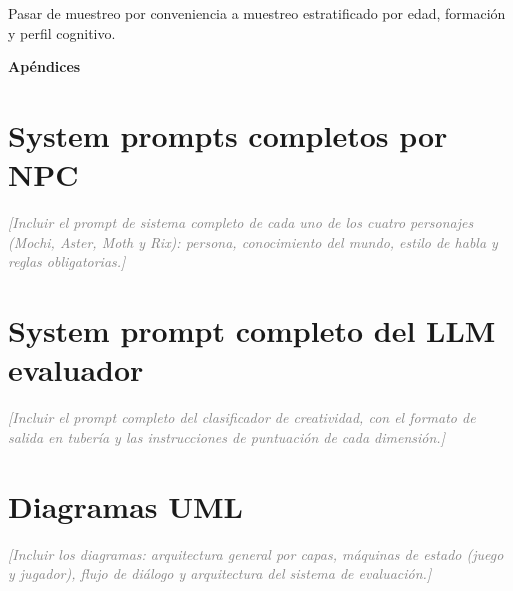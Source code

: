 \documentclass[12pt,twoside,titlepage]{report}
\newcommand\blankpage{%
    \newpage
    \null
    \thispagestyle{empty}%
    \newpage}
\begin{document}
Pasar de muestreo por conveniencia a muestreo estratificado por edad, formación y perfil cognitivo.


{}

\footnotesize{
%


}



\raggedbottom
\afterpage{\blankpage}

\newpage





\appendix

{}

\mbox{}
\vfill
\begin{center}
\begin{Huge}
\textbf{Apéndices}
\end{Huge}
\end{center}
\vfill
\mbox{}
\thispagestyle{empty}

\newpage
\mbox{}
\thispagestyle{empty}
\newpage


\chapter{System prompts completos por NPC}
\textcolor{gray}{\textit{[Incluir el prompt de sistema completo de cada uno de los cuatro personajes (Mochi, Aster, Moth y Rix): persona, conocimiento del mundo, estilo de habla y reglas obligatorias.]}}

\chapter{System prompt completo del LLM evaluador}
\textcolor{gray}{\textit{[Incluir el prompt completo del clasificador de creatividad, con el formato de salida en tubería y las instrucciones de puntuación de cada dimensión.]}}

\chapter{Diagramas UML}
\textcolor{gray}{\textit{[Incluir los diagramas: arquitectura general por capas, máquinas de estado (juego y jugador), flujo de diálogo y arquitectura del sistema de evaluación.]}}
\end{document}
